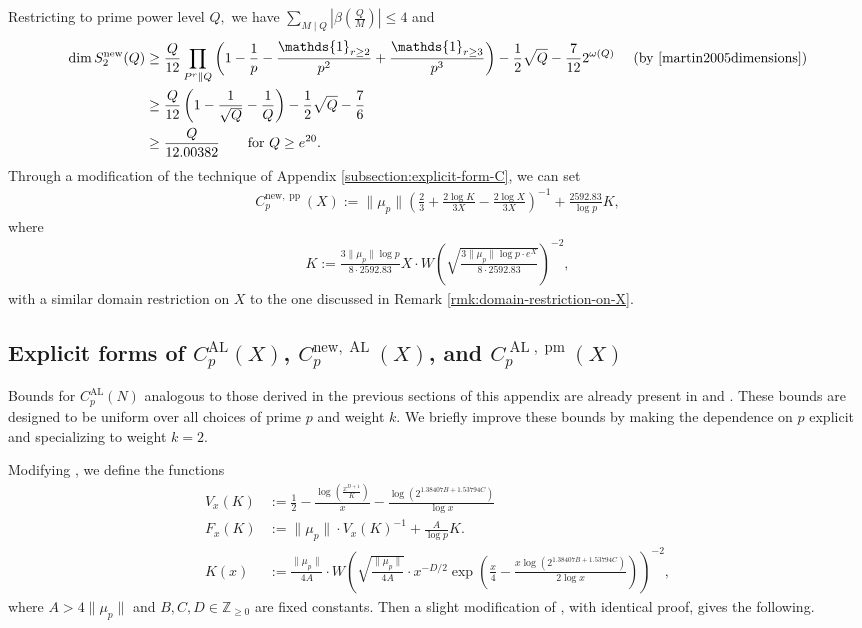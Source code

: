 \documentclass[11pt,letterpaper,reqno]{amsart}
\theoremstyle{definition}
\numberwithin{equation}{section}
\numberwithin{figure}{section}
\numberwithin{table}{section}
\let\subsectiontemp\subsection
\renewcommand{\subsection}[1]{ 
    \subsectiontemp{#1} \hfill\vspace{0.5\linespacing} 
}
\newcommand{\nw}{\mathrm{new}}
\begin{document}
 
    Restricting to prime power level $Q,$ we have $\sum_{M \mid Q} \left| \beta \left( \frac{Q}{M} \right) \right| \leq 4$ and
    \begin{align}
    \dim S_2^\nw(Q) &\geq \frac{Q}{12} \prod_{P^r \| Q} \left( 1 - \frac{1}{p} - \frac{\mathds{1}_{r \geq 2}}{p^2} + \frac{\mathds{1}_{r \geq 3}}{p^3}  \right) - \frac{1}{2} \sqrt{Q} - \frac{7}{12} 2^{\omega(Q)} \quad\ \text{(by \cite[Theorem 1]{martin2005dimensions})}\\
    &\geq \frac{Q}{12} \left( 1 - \frac{1}{\sqrt{Q}} - \frac{1}{Q}  \right) - \frac{1}{2} \sqrt{Q} - \frac{7}{6}\\
    &\geq \frac{Q}{12.00382} \qquad \text{for $Q \geq e^{20}$.}
\end{align}
Through a modification of the technique of Appendix \ref{subsection:explicit-form-C}, we can set
\begin{align}
    C_p^{\nw, \operatorname{pp}}(X) := \| \mu_p \| \left( \frac{2}{3} + \frac{2\log K}{3X} - \frac{2 \log X}{3X} \right)^{-1} + \frac{2592.83}{\log p} K,
\end{align}
where
\begin{align}
    K := \frac{3 \| \mu_p \| \log p}{8 \cdot 2592.83} X \cdot W \!\left(  \sqrt{\frac{3 \| \mu_p \| \log p \cdot e^X}{8 \cdot 2592.83}} \right)^{-2},
\end{align}
with a similar domain restriction on $X$ to the one discussed in Remark \ref{rmk:domain-restriction-on-X}.


\subsection{Explicit forms of \texorpdfstring{$C_p^{\operatorname{AL}}(X)$}{Cp(sigma)(X)}, \texorpdfstring{$C_p^{\nw, \operatorname{AL}}(X)$}{Cp(new sigma)(X)}, and \texorpdfstring{$C_p^{\operatorname{AL}, \operatorname{pm}}(X)$}{Cp(sigma, p)(X)}}\label{subsection:explicit-form-sigma}

Bounds for $C_p^{\operatorname{AL}}(N)$ analogous to those derived in the previous sections of this appendix are already present in \cite[\S3.1]{KMRX} and \cite[\S3.3]{KMRX}. These bounds are designed to be uniform over all choices of prime $p$ and weight $k.$ We briefly improve these bounds by making the dependence on $p$ explicit and specializing to weight $k = 2.$

Modifying \cite[\S3.1]{KMRX}, we define the functions
\begin{align}
        V_x(K) &:= \frac{1}{2} - \frac{\log\left( \frac{x^{D + 1}}{K}  \right)}{x} - \frac{\log \left( 2^{1.38407B +  1.53794C}  \right)}{\log x}\\
        F_x(K) &:= \| \mu_p \| \cdot V_x(K)^{-1} + \frac{A}{\log p} K.\\
            K(x) &:= \frac{\| \mu_p \|}{4A} \cdot W\! \left( \sqrt{\frac{\| \mu_p \|}{4A}} \cdot x^{-D/2} \exp\left( \frac{x}{4} - \frac{x \log\left( 2^{1.38407B +  1.53794C}  \right)}{2\log x}  \right)  \right)^{-2},
\end{align}
where $A > 4 \| \mu_p \|$ and $B, C, D \in \mathbb{Z}_{\geq 0}$ are fixed constants. Then a slight modification of \cite[Lemma 3.4]{KMRX}, with identical proof, gives the following.
\end{document}
